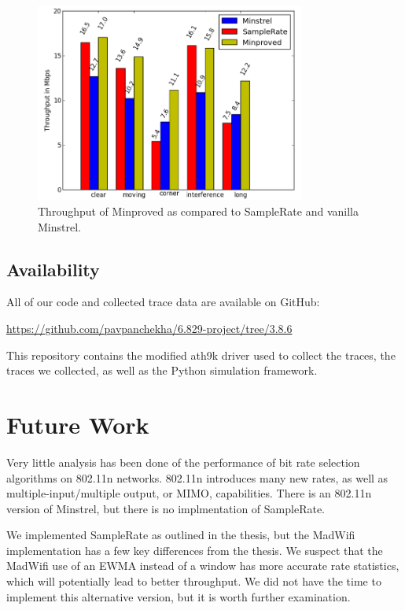\documentclass[letterpaper,twocolumn,10pt]{article}
\begin{document}
\begin{figure}[htb]
  \hspace{-2em}\includegraphics[width=3.5in]{mnVSspVSmp1.png}\vspace{-0em}
  \caption{Throughput of Minproved as compared to SampleRate and vanilla Minstrel.}
\label{figure:4}
\end{figure}


\subsection{Availability}
All of our code and collected trace data are available on GitHub:

\noindent
\small{\url{https://github.com/pavpanchekha/6.829-project/tree/3.8.6}}

This repository contains the modified ath9k driver used to collect the traces, the traces we collected, as well as the Python simulation framework. 

\section{Future Work}

Very little analysis has been done of the performance of bit rate selection algorithms on 802.11n networks. 802.11n introduces many new rates, as well as multiple-input/multiple output, or MIMO, capabilities. There is an 802.11n version of Minstrel, but there is no implmentation of SampleRate. 

We implemented SampleRate as outlined in the thesis, but the MadWifi implementation has a few key differences from the thesis. We suspect that the MadWifi use of an EWMA instead of a window has more accurate rate statistics, which will potentially lead to better throughput. We did not have the time to implement this alternative version, but it is worth further examination.
\end{document}
